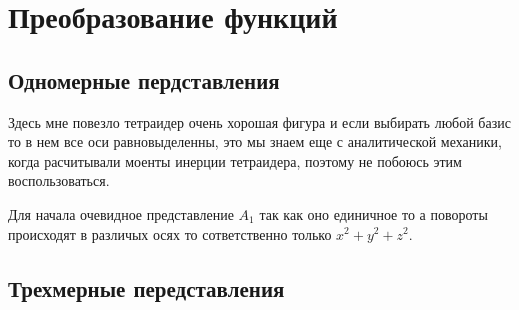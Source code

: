 \section{Преобразование функций}

\subsection{Одномерные пердставления}

Здесь мне повезло тетраидер очень хорошая фигура и если выбирать любой 
базис то в нем все оси равновыделенны, это мы знаем еще с аналитической
механики, когда расчитывали моенты инерции тетраидера, поэтому не 
побоюсь этим воспользоваться.

Для начала очевидное представление $A_1$ так как оно единичное то 
а повороты происходят в различых осях то сответственно только $x^2+y^2+z^2$.

\subsection{Трехмерные передставления}

